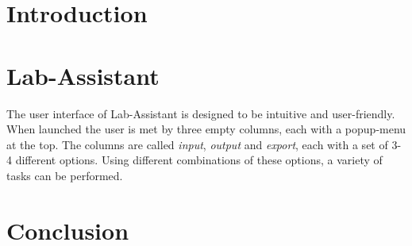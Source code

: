 \documentclass[twocolumn]{article}
\begin{document}
\section{Introduction}


\section{Lab-Assistant}

The user interface of Lab-Assistant is designed to be intuitive and user-friendly. When launched the user is met by three empty columns, each with a popup-menu at the top. The columns are called \emph{input}, \emph{output} and \emph{export}, each with a set of 3-4 different options. Using different combinations of these options, a variety of tasks can be performed.






\section{Conclusion}

\end{document}
